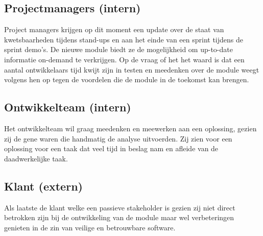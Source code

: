\subsection{Projectmanagers (intern)}\label{subsec:projectmanagers-(intern)}
Project managers krijgen op dit moment een update over de staat van kwetsbaarheden tijdens stand-ups en aan het einde van een sprint tijdens de sprint demo's.
De nieuwe module biedt ze de mogelijkheid om up-to-date informatie on-demand te verkrijgen.
Op de vraag of het het waard is dat een aantal ontwikkelaars tijd kwijt zijn in testen en meedenken over de module weegt volgens hen op tegen de voordelen die de module in de toekomst kan brengen.
\subsection{Ontwikkelteam (intern)}\label{subsec:ontwikkelteam-(intern)}
Het ontwikkelteam wil graag meedenken en meewerken aan een oplossing, gezien zij de gene waren die handmatig de analyse uitvoerden.
Zij zien voor een oplossing voor een taak dat veel tijd in beslag nam en afleide van de daadwerkelijke taak.
\subsection{Klant (extern)}\label{subsec:klant-(extern)}
Als laatste de klant welke een passieve stakeholder is gezien zij niet direct betrokken zijn bij de ontwikkeling van de module maar wel verbeteringen genieten in de zin van veilige en betrouwbare software.
